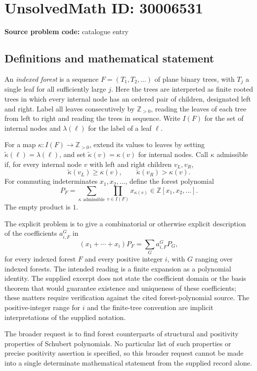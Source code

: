 \documentclass[11pt]{article}
\newcommand{\Z}{\mathbb{Z}}
\begin{document}
\section*{UnsolvedMath ID: 30006531}
\textbf{Source problem code:} catalogue entry
\subsection{Definitions and mathematical statement}
An \emph{indexed forest} is a sequence \(F=(T_1,T_2,\ldots)\) of plane binary trees, with \(T_j\) a single leaf for all sufficiently large \(j\). Here the trees are interpreted as finite rooted trees in which every internal node has an ordered pair of children, designated left and right. Label all leaves consecutively by \(\Z_{>0}\), reading the leaves of each tree from left to right and reading the trees in sequence. Write \(I(F)\) for the set of internal nodes and \(\lambda(\ell)\) for the label of a leaf \(\ell\).

For a map \(\kappa:I(F)\to\Z_{>0}\), extend its values to leaves by setting \(\widetilde\kappa(\ell)=\lambda(\ell)\), and set \(\widetilde\kappa(v)=\kappa(v)\) for internal nodes. Call \(\kappa\) admissible if, for every internal node \(v\) with left and right children \(v_L,v_R\),
\[
\widetilde\kappa(v_L)\geq\kappa(v),\qquad
\widetilde\kappa(v_R)>\kappa(v).
\]
For commuting indeterminates \(x_1,x_2,\ldots\), define the forest polynomial
\[
P_F=\sum_{\kappa\text{ admissible}}\prod_{v\in I(F)}x_{\kappa(v)}
\in\Z[x_1,x_2,\ldots].
\]
The empty product is \(1\).

The explicit problem is to give a combinatorial or otherwise explicit description of the coefficients \(a^G_{i,F}\) in
\[
(x_1+\cdots+x_i)P_F=\sum_G a^G_{i,F}P_G,
\]
for every indexed forest \(F\) and every positive integer \(i\), with \(G\) ranging over indexed forests. The intended reading is a finite expansion as a polynomial identity. The supplied excerpt does not state the coefficient domain or the basis theorem that would guarantee existence and uniqueness of these coefficients; these matters require verification against the cited forest-polynomial source. The positive-integer range for \(i\) and the finite-tree convention are implicit interpretations of the supplied notation.

The broader request is to find forest counterparts of structural and positivity properties of Schubert polynomials. No particular list of such properties or precise positivity assertion is specified, so this broader request cannot be made into a single determinate mathematical statement from the supplied record alone.
\end{document}
